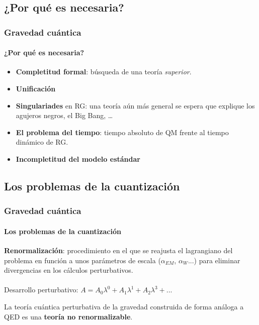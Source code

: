 \documentclass{beamer}
\begin{document}
\subsection{¿Por qué es necesaria?}
\begin{frame}
\frametitle{Gravedad cuántica}
\framesubtitle{¿Por qué es necesaria?}
\begin{block}{}
  \begin{itemize}
    \item \textbf{Completitud formal}: búsqueda de una teoría \emph{superior}.
    \item \textbf{Unificación}
    \item \textbf{Singulariades} en RG: una teoría aún más general se espera que explique los agujeros negros, el Big Bang, \dots
    \item \textbf{El problema del tiempo}: tiempo absoluto de QM frente al tiempo dinámico de RG.
    \item \textbf{Incompletitud del modelo estándar}
  \end{itemize}
\end{block}
\end{frame}

\subsection{Los problemas de la cuantización}
\begin{frame}
\frametitle{Gravedad cuántica}
 \framesubtitle{Los problemas de la cuantización}
 \begin{exampleblock}{}
   \textbf{Renormalización}: procedimiento en el que se reajusta el lagrangiano del problema en función a unos parámetros de escala ($\alpha_{EM}$, $\alpha_{W}$...) para eliminar divergencias en los cálculos perturbativos.\\
   ~\\\centering
 Desarrollo perturbativo: $A=A_0\lambda^0+A_1\lambda^1+A_2\lambda^3+...$
\end{exampleblock}
 \begin{alertblock}{}
   La teoría cuántica perturbativa de la gravedad construida de forma análoga a QED es una \textbf{teoría no renormalizable}.
 \end{alertblock}
 \end{frame}
\end{document}
